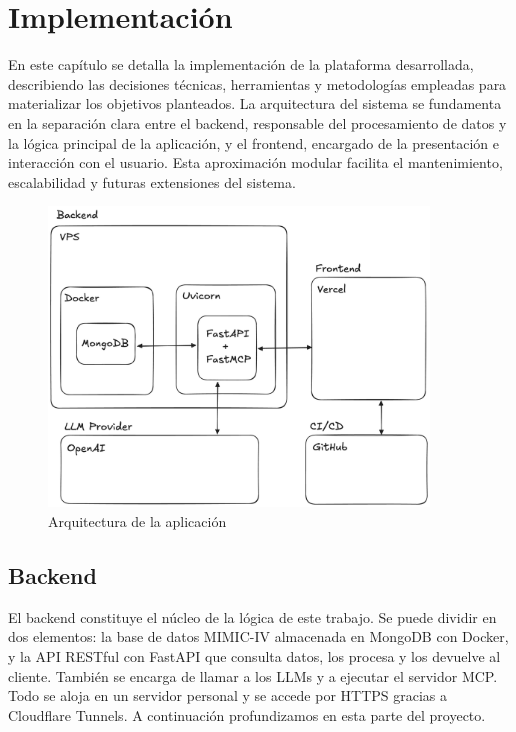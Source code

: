 \chapter{Implementación}

En este capítulo se detalla la implementación de la plataforma desarrollada, describiendo las decisiones técnicas, herramientas y metodologías empleadas para materializar los objetivos planteados. La arquitectura del sistema se fundamenta en la separación clara entre el backend, responsable del procesamiento de datos y la lógica principal de la aplicación, y el frontend, encargado de la presentación e interacción con el usuario. Esta aproximación modular facilita el mantenimiento, escalabilidad y futuras extensiones del sistema. 

\begin{figure}[H]
  \centering
  \includegraphics[width=0.9\textwidth]{imagenes/arch1.png}
  \caption{Arquitectura de la aplicación}
  \label{fig:arch1}
\end{figure}

\section{Backend}

El backend constituye el núcleo de la lógica de este trabajo. Se puede dividir en dos elementos: la base de datos MIMIC-IV almacenada en MongoDB con Docker, y la API RESTful con FastAPI que consulta datos, los procesa y los devuelve al cliente. También se encarga de llamar a los LLMs y a ejecutar el servidor MCP. Todo se aloja en un servidor personal y se accede por HTTPS gracias a Cloudflare Tunnels. A continuación profundizamos en esta parte del proyecto.

